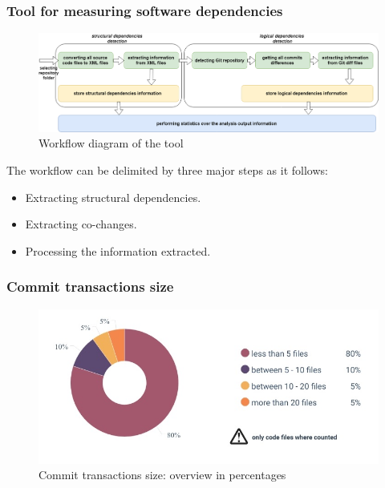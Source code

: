 \documentclass{beamer}
\begin{document}
 \begin{frame}
\frametitle{Tool for measuring software dependencies}

\begin{center}
     \begin{figure}[H]
	\includegraphics[width=\textwidth]{fig3.png}
	\caption{\label{fig:fig3}Workflow diagram of the tool}
     \end{figure}
\end{center}

\changefontsizes{7.5pt}
The workflow can be delimited by three major steps as it follows:
\begin{itemize}
\item Extracting structural dependencies.
\item Extracting co-changes.
\item Processing the information extracted.
\end{itemize}

\end{frame}


 \begin{frame}
\frametitle{Commit transactions size }
\vskip 0.2cm
\begin{center}
     \begin{figure}
	\includegraphics[width=\textwidth]{cs_size.jpg}
	\caption{\label{fig:fig4}Commit transactions size: overview in percentages}
     \end{figure}
\end{center}

\end{frame}
\end{document}
